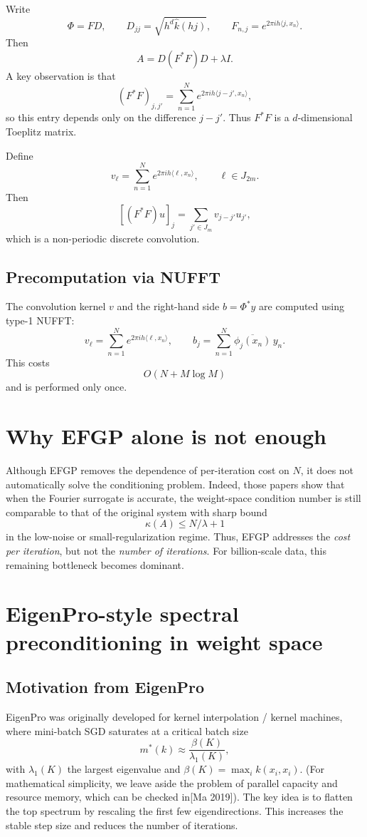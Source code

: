 \documentclass{article}
\begin{document}
Write
\[
\Phi=F D,
\qquad
D_{jj}=\sqrt{h^d\widehat{k}(hj)},
\qquad
F_{n,j}=e^{2\pi i h\langle j,x_n\rangle}.
\]
Then
\[
A = D(F^*F)D + \lambda I.
\]
A key observation is that
\[
(F^*F)_{j,j'}
=
\sum_{n=1}^N e^{2\pi i h\langle j-j',x_n\rangle},
\]
so this entry depends only on the difference \(j-j'\). Thus \(F^*F\) is a \(d\)-dimensional Toeplitz matrix.


Define
\[
v_\ell=\sum_{n=1}^N e^{2\pi i h\langle \ell,x_n\rangle},
\qquad
\ell\in J_{2m}.
\]
Then
\[
[(F^*F)u]_j = \sum_{j'\in J_m} v_{j-j'}u_{j'},
\]
which is a non-periodic discrete convolution.

\subsection{Precomputation via NUFFT}

The convolution kernel \(v\) and the right-hand side \(b=\Phi^*y\) are computed using type-1 NUFFT:
\[
v_\ell=\sum_{n=1}^N e^{2\pi i h\langle \ell,x_n\rangle},
\qquad
b_j=\sum_{n=1}^N \overline{\phi_j(x_n)}\, y_n.
\]
This costs
\[
O(N+M\log M)
\]
and is performed only once.

\section{Why EFGP alone is not enough}

Although EFGP removes the dependence of per-iteration cost on \(N\), it does not automatically solve the conditioning problem. Indeed, those papers show that when the Fourier surrogate is accurate, the weight-space condition number is still comparable to that of the original system with sharp bound
\[
\kappa(A) \leq N/\lambda+1
\]
in the low-noise or small-regularization regime. Thus, EFGP addresses the \emph{cost per iteration}, but not the \emph{number of iterations}. For billion-scale data, this remaining bottleneck becomes dominant.

\section{EigenPro-style spectral preconditioning in weight space}
\subsection{Motivation from EigenPro}

EigenPro was originally developed for kernel interpolation / kernel machines, where mini-batch SGD saturates at a critical batch size
\[
m^*(k)\approx \frac{\beta(K)}{\lambda_1(K)},
\]
with \(\lambda_1(K)\) the largest eigenvalue and \(\beta(K)=\max_i k(x_i,x_i)\). (For mathematical simplicity, we leave aside the problem of parallel capacity and resource memory, which can be checked in[Ma 2019]). The key idea is to flatten the top spectrum by rescaling the first few eigendirections. This increases the stable step size and reduces the number of iterations.
\end{document}
